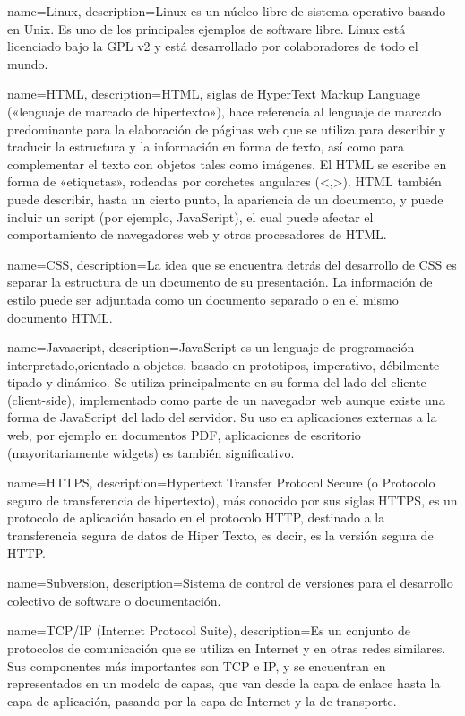 {name=Linux,
 description={Linux es un núcleo libre de sistema operativo basado en Unix. Es uno de los principales ejemplos de software libre. Linux está licenciado bajo la GPL v2 y está desarrollado por colaboradores de todo el mundo.}
 }

{name=HTML,
 description={HTML, siglas de HyperText Markup Language («lenguaje de marcado de hipertexto»), hace referencia al lenguaje de marcado predominante para la elaboración de páginas web que se utiliza para describir y traducir la estructura y la información en forma de texto, así como para complementar el texto con objetos tales como imágenes. El HTML se escribe en forma de «etiquetas», rodeadas por corchetes angulares (<,>). HTML también puede describir, hasta un cierto punto, la apariencia de un documento, y puede incluir un script (por ejemplo, JavaScript), el cual puede afectar el comportamiento de navegadores web y otros procesadores de HTML.}
 }
 
{name=CSS,
 description={La idea que se encuentra detrás del desarrollo de CSS es separar la estructura de un documento de su presentación. La información de estilo puede ser adjuntada como un documento separado o en el mismo documento HTML.}
 }
 
{name=Javascript,
 description={JavaScript es un lenguaje de programación interpretado,orientado a objetos, basado en prototipos, imperativo, débilmente tipado y dinámico. Se utiliza principalmente en su forma del lado del cliente (client-side), implementado como parte de un navegador web aunque existe una forma de JavaScript del lado del servidor. Su uso en aplicaciones externas a la web, por ejemplo en documentos PDF, aplicaciones de escritorio (mayoritariamente widgets) es también significativo.}
 }
 
{name=HTTPS,
 description={Hypertext Transfer Protocol Secure (o Protocolo seguro de transferencia de hipertexto), más conocido por sus siglas HTTPS, es un protocolo de aplicación basado en el protocolo HTTP, destinado a la transferencia segura de datos de Hiper Texto, es decir, es la versión segura de HTTP.}
 }
 
{name=Subversion,
 description={Sistema de control de versiones para el desarrollo colectivo de software o documentación.}
 }
 
{name=TCP/IP (Internet Protocol Suite),
 description={Es un conjunto de protocolos de comunicación que se utiliza en Internet y en otras redes similares. Sus componentes más importantes son TCP e IP, y se encuentran en representados en un modelo de capas, que van desde la capa de enlace hasta la capa de aplicación, pasando por la capa de Internet y la de transporte.}
 }
 

